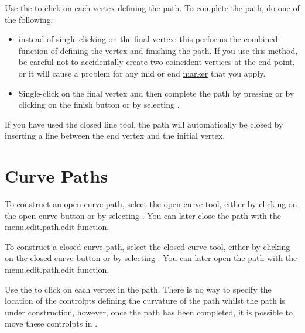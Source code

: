 Use the  to click on each vertex
defining the path. To complete the \gls{path}, do one of the following:
\begin{itemize}
\item {} instead of single-clicking
on the final vertex: this performs the combined function of defining
the vertex and finishing the path. If you use this method, be
careful not to accidentally create two coincident vertices at the
end point, or it will cause a problem for any mid or end
\hyperref[sec:markers]{marker} that you apply.

\item Single-\gls{click} on the final vertex and then
complete the path by pressing  or by
clicking on the finish button or by selecting
.
\end{itemize}
If you have used the closed line tool, the path will automatically
be closed by inserting a line between the end vertex
and the initial vertex.


\section{Curve Paths}\label{sec:newcurvepath}


To construct an open curve \gls{path}, select the open curve tool,
either by clicking on the open curve button or by selecting
. You can later close the \gls{path}
with the \gls{menu.edit.path.edit} function.


To construct a closed curve \gls{path}, select the closed curve tool,
either by clicking on the closed curve button or by selecting
. You can later open the \gls{path}
with the \gls{menu.edit.path.edit} function.

Use the  to click on each vertex in
the \gls*{path}.  There is no way to specify the location of the
\glspl{controlpt} defining the curvature of the \gls*{path} whilst the
\gls*{path} is under construction, however, once the
\gls*{path} has been completed, it is possible to move these
\glspl*{controlpt} in \editpathmode.

